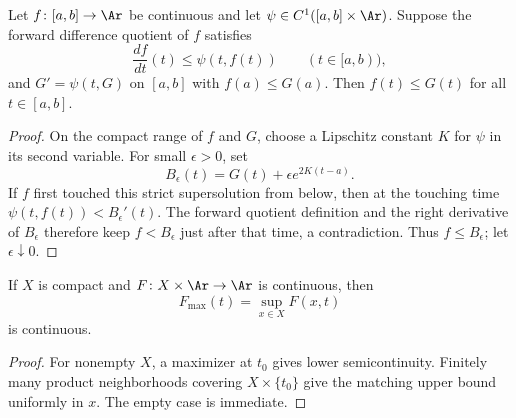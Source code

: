 \begin{lemma}
\label{lem:forward-difference-quotient}
\leanok
\label{fordiffquot}




Let $f\colon[a,b]\to\Ar$ be continuous and let
$\psi\in C^1([a,b]\times\Ar)$. Suppose the forward difference quotient
of $f$ satisfies
$$\frac{df}{dt}(t)\le\psi(t,f(t))\qquad(t\in[a,b)),$$
and $G'=\psi(t,G)$ on $[a,b]$ with $f(a)\le G(a)$. Then
$f(t)\le G(t)$ for all $t\in[a,b]$.
\end{lemma}
\begin{proof}
\sketch
{}
\leanok
On the compact range of $f$ and $G$, choose a Lipschitz constant $K$
for $\psi$ in its second variable. For small $\epsilon>0$, set
$$B_\epsilon(t)=G(t)+\epsilon e^{2K(t-a)}.$$
If $f$ first touched this strict supersolution from below, then at the
touching time
$\psi(t,f(t))<B_\epsilon'(t)$. The forward quotient definition and the
right derivative of $B_\epsilon$ therefore keep $f<B_\epsilon$ just
after that time, a contradiction. Thus $f\le B_\epsilon$; let
$\epsilon\downarrow0$.
\end{proof}

\begin{lemma}
\label{lem:max-function-continuous-product}
\leanok


If $X$ is compact and $F\colon X\times\Ar\to\Ar$ is continuous, then
$$F_{\max}(t)=\sup_{x\in X}F(x,t)$$
is continuous.
\end{lemma}
\begin{proof}
\sketch
\leanok
For nonempty $X$, a maximizer at $t_0$ gives lower semicontinuity.
Finitely many product neighborhoods covering $X\times\{t_0\}$ give the
matching upper bound uniformly in $x$. The empty case is immediate.
\end{proof}


